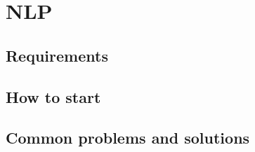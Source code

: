\documentclass[main.tex]{subfiles}
\begin{document}
	\chapter{NLP}
	
	\section{Requirements}
	
	\section{How to start}
	
	\section{Common problems and solutions}
\end{document}
